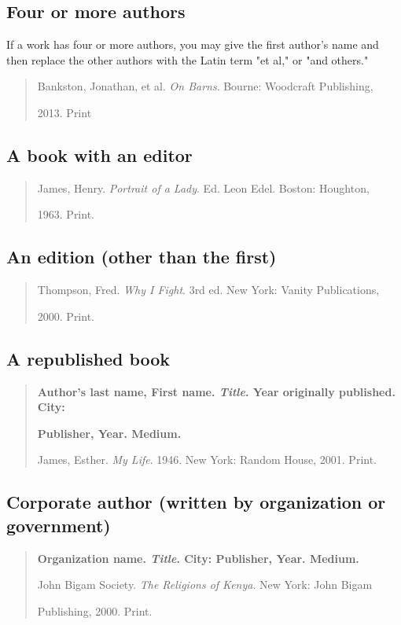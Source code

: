 \subsection{Four or more authors}
If a work has four or more authors, you may give the first author's name and then replace the other authors with the Latin term "et al," or "and others."

\begin{quote}

Bankston, Jonathan, et al. \emph{On Barns}. Bourne: Woodcraft Publishing,

\hspace{.4in}2013. Print

\end{quote}

\subsection{A book with an editor}
\begin{quote}
James, Henry. \emph{Portrait of a Lady}. Ed. Leon Edel. Boston: Houghton,

\hspace{.4in}1963. Print.
\end{quote}

\subsection{An edition (other than the first)}
\begin{quote}
Thompson, Fred. \emph{Why I Fight}. 3rd ed. New York: Vanity Publications,

\hspace{.4in}2000. Print.
\end{quote}

\subsection{A republished book}
\begin{quote}
\textbf{Author's last name, First name. \emph{Title}. Year originally published. City: }

\hspace{.4in}\textbf{Publisher, Year. Medium.}
\medskip

James, Esther. \emph{My Life}. 1946. New York: Random House, 2001. Print.
\end{quote}

\subsection{Corporate author (written by organization or government)}
\begin{quote}

\textbf{Organization name. \emph{Title}. City: Publisher, Year. Medium.}
\medskip

John Bigam Society. \emph{The Religions of Kenya}. New York: John Bigam 

\hspace{.4in}Publishing, 2000. Print.
\end{quote}

